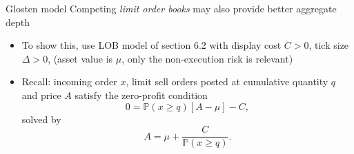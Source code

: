 \documentclass[english,10pt
,aspectratio=169
]{beamer}
\begin{document}
%
%


\begin{frame}{Glosten model}
	Competing \emph{limit order books} may also provide better aggregate depth
	\begin{itemize}
		\item To show this, use LOB model of section 6.2 with display cost $C>0$, tick size $\Delta >0$,  (asset value is $\mu$, only the non-execution risk is relevant)
		\item Recall: incoming order $x$, limit sell orders posted at cumulative quantity $q$ and price $A$ satisfy the zero-profit condition
		\[
		0 = \mathbb{P}(x \geq q)[A-\mu]-C,
		\]
		solved by 
		\begin{equation} \tag{6.7}
		A= \mu + \frac{C}{\mathbb{P}(x \geq q)}.
		\end{equation}
	\end{itemize}
\end{frame}
\end{document}
